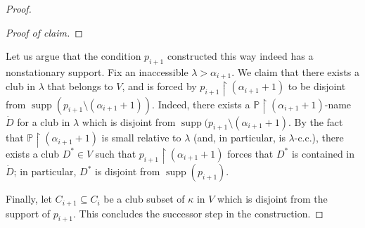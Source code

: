 \documentclass[11pt]{amsart}
\renewcommand{\restriction}{\mathbin\upharpoonright}    %
\theoremstyle{definition}
\newcounter{condition}
\theoremstyle{remark}
\newcommand\<{{<}}
\DeclareMathOperator{\supp}{supp}
\newcommand{\po}{\mathbb{P}}
\begin{document}
\begin{proof}
\begin{proof}[Proof of claim]
\end{proof}
    Let us argue that the condition $p_{i+1}$ constructed this way indeed has a nonstationary support. Fix an inaccessible $\lambda>\alpha_{i+1}$. We claim that there exists a club in $\lambda$ that belongs to $V$, and is forced by $p_{i+1}\restriction (\alpha_{i+1}+1)$ to be disjoint from $\supp(p_{i+1}\setminus (\alpha_{i+1}+1))$. Indeed, there exists a $\po\restriction (\alpha_{i+1}+1)$-name $\dot{D}$ for a club in $\lambda$ which is disjoint from $\supp(p_{i+1}\setminus (\alpha_{i+1}+1)$. By the fact that $\po\restriction (\alpha_{i+1}+1)$ is small relative to $\lambda$ (and, in particular, is $\lambda$-c.c.), there exists a club $D^*\in V$ such that $p_{i+1}\restriction (\alpha_{i+1}+1)$ forces that $D^*$ is contained in $\dot{D}$; in particular, $D^*$ is disjoint from $\supp(p_{i+1})$.
    
    Finally, let $C_{i+1}\subseteq C_i$ be a club subset of $\kappa$ in $V$ which is  disjoint from the support of $p_{i+1}$. This concludes the successor step in the construction.


\end{proof}
\end{document}
